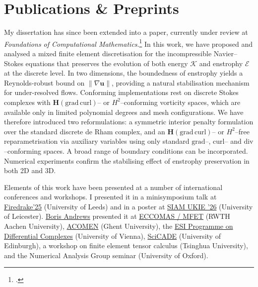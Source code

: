 \documentclass[a4paper,10pt]{article}
\newcommand{\subsectitle}[1]{\noindent{\color{brick}\fontsize{15}{17}\selectfont #1}\par\vspace{2pt}}
\newcommand{\clink}[2]{\textcolor{linkcol}{\href{#1}{#2}}}
\begin{document}
\section*{Publications \& Preprints}
My dissertation has since been extended into a paper, currently under review at \textit{Foundations of Computational Mathematics}.\footcite{andrews2026stronglyenstrophystableintegratorsincompressible} In this work, we have proposed and analysed a mixed finite element discretisation for the incompressible
Navier--Stokes equations that preserves the
evolution of both energy $\mathcal{K}$ and enstrophy $\mathcal{E}$ at the discrete level.
In two dimensions, the boundedness of enstrophy yields a Reynolds-robust bound on
$\|\nabla\mathbf{u}\|$, providing a natural stabilisation mechanism for under-resolved flows.
Conforming implementations rest on discrete Stokes complexes with
$\mathbf{H}(\mathrm{grad}\,\mathrm{curl})$-- or $H^2$--conforming vorticity spaces, which are available only in limited polynomial degrees and mesh
configurations.
We have therefore introduced two reformulations: a symmetric interior penalty formulation over the
standard discrete de Rham complex, and an
$\mathbf{H}(\mathrm{grad}\,\mathrm{curl})$-- or $H^2$--free reparametrisation via auxiliary variables
using only standard $\mathrm{grad}$--, $\mathrm{curl}$-- and $\mathrm{div}$--conforming spaces. A broad range of boundary conditions can be incorporated.
Numerical experiments confirm the stabilising effect of enstrophy
preservation in both 2D and 3D.

\vspace{10pt}
\subsectitle{Seminars \& Conferences}
Elements of this work have been presented at a number of international conferences and workshops.
I presented it in a minisymposium talk at \clink{https://www.firedrakeproject.org/firedrake_25.html}{Firedrake'25} (University of Leeds) and in a poster at \clink{https://sites.google.com/view/siamukie26/home}{SIAM UKIE '26} (University of Leicester).
\textcolor{midnight}{\href{https://borisandrews.github.io/}{Boris Andrews}} presented it at \clink{https://mfet2025.de/}{ECCOMAS / MFET} (RWTH Aachen University),
\clink{https://cage.ugent.be/acomen2025/}{ACOMEN} (Ghent University), the \clink{https://www.esi.ac.at/events/t3204/}{ESI Programme on Differential Complexes} (University of Vienna),
\clink{https://scicade.org/}{SciCADE} (University of Edinburgh), a workshop on finite element tensor calculus (Tsinghua University),
and the Numerical Analysis Group seminar (University of Oxford).
\end{document}
